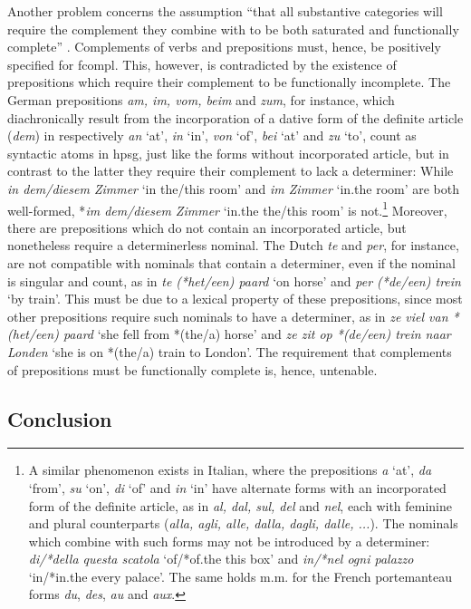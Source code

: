\documentclass[output=paper]{langsci/langscibook}
\begin{document}
Another problem concerns the assumption ``that all substantive categories will 
require the complement they combine with to be both saturated and 
functionally complete'' \citep[311]{Netter94}. Complements of verbs and 
prepositions must, hence, be positively specified for {\sc fcompl}. 
This, however, is contradicted by the existence of 
prepositions which require their complement to be functionally incomplete. 
The German prepositions \emph{am, im, vom, beim} and \emph{zum}, for instance, 
which diachronically result from the incorporation of a dative form of the 
definite article (\emph{dem}) in respectively \emph{an} `at', 
\emph{in} `in', \emph{von} `of', \emph{bei} `at' and \emph{zu} `to',
count as syntactic atoms in {\sc hpsg}, just like 
the forms without incorporated article, but in contrast to the 
latter they require their complement to lack a determiner: While  
\emph{in dem/diesem Zimmer} `in the/this room' and \emph{im Zimmer} `in.the room'
are both well-formed, *\emph{im dem/diesem Zimmer} `in.the the/this room' is 
not.\footnote{A similar phenomenon exists in Italian, where the prepositions 
\emph{a} `at', \emph{da} `from', \emph{su} `on', \emph{di} `of' and \emph{in} `in' 
have alternate forms with an incorporated form of the definite article, as in  
\emph{al, dal, sul, del} and \emph{nel}, each with 
feminine and plural counterparts (\emph{alla, agli, alle, dalla, dagli, dalle, ...}). 
The nominals which combine with such forms may not be introduced by a determiner:
\emph{di/*della questa scatola} `of/*of.the this box' and \emph{in/*nel ogni palazzo} 
`in/*in.the every palace'. The same holds m.m. for the French 
portemanteau forms \emph{du}, \emph{des}, \emph{au} and \emph{aux}.}   
Moreover, there are prepositions which do not contain an 
incorporated article, but nonetheless require a determinerless nominal. 
The Dutch \emph{te} and \emph{per}, for instance, are not compatible with nominals 
that contain a determiner, even if the nominal is singular and count, 
as in \emph{te (*het/een) paard} `on horse' and \emph{per (*de/een) trein} `by train'.   
This must be due to a lexical property of these prepositions, 
since most other prepositions require such nominals to have 
a determiner, as in \emph{ze viel van *(het/een) paard} `she fell from *(the/a) horse' 
and \emph{ze zit op *(de/een) trein naar Londen} `she is on *(the/a) train to London'.  
The requirement that complements of prepositions must be functionally complete is,
hence, untenable.  


\subsection{Conclusion} 
\end{document}
